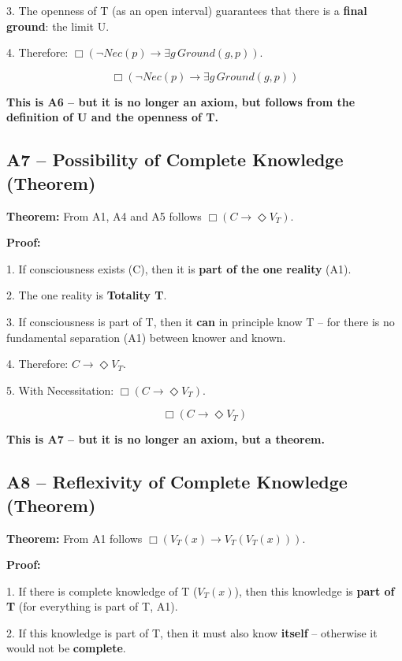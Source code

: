 \documentclass[
]{article}
\begin{document}
3. The openness of T (as an open interval) guarantees that there is a \textbf{final ground}: the limit U.

4. Therefore: \(\Box(\neg Nec(p) \rightarrow \exists g\, Ground(g,p))\).

\[
\boxed{\Box(\neg Nec(p) \rightarrow \exists g\, Ground(g,p))}
\]

\textbf{This is A6 – but it is no longer an axiom, but follows from the definition of U and the openness of T.}

\subsection{A7 – Possibility of Complete Knowledge (Theorem)}\label{a7-possibility-of-complete-knowledge-theorem}

\textbf{Theorem:} From A1, A4 and A5 follows \(\Box(C \rightarrow \Diamond V_T)\).

\textbf{Proof:}

1. If consciousness exists (C), then it is \textbf{part of the one reality} (A1).

2. The one reality is \textbf{Totality T}.

3. If consciousness is part of T, then it \textbf{can} in principle know T – for there is no fundamental separation (A1) between knower and known.

4. Therefore: \(C \rightarrow \Diamond V_T\).

5. With Necessitation: \(\Box(C \rightarrow \Diamond V_T)\).

\[
\boxed{\Box(C \rightarrow \Diamond V_T)}
\]

\textbf{This is A7 – but it is no longer an axiom, but a theorem.}

\subsection{A8 – Reflexivity of Complete Knowledge (Theorem)}\label{a8-reflexivity-of-complete-knowledge-theorem}

\textbf{Theorem:} From A1 follows \(\Box(V_T(x) \rightarrow V_T(V_T(x)))\).

\textbf{Proof:}

1. If there is complete knowledge of T (\(V_T(x)\)), then this knowledge is \textbf{part of T} (for everything is part of T, A1).

2. If this knowledge is part of T, then it must also know \textbf{itself} – otherwise it would not be \textbf{complete}.
\end{document}
